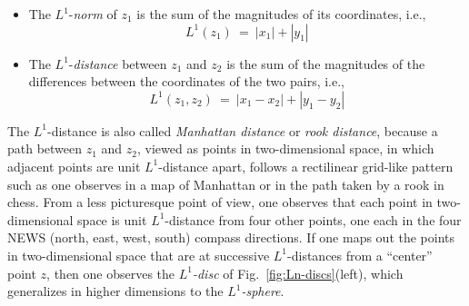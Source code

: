 \begin{itemize}
\item
The $L^1$-{\it norm} of $z_1$ is the sum of the magnitudes of its coordinates, i.e.,
\[ L^1(z_1) \ = \ |x_1| + |y_1|  \]  

\medskip\item
The $L^1$-{\it distance} between $z_1$ and $z_2$ is the sum of the magnitudes of the differences between the coordinates of the two pairs, i.e.,
\[ L^1(z_1, z_2) \ = \ |x_1 - x_2| + |y_1 - y_2| \]
\end{itemize}
The $L^1$-distance is also called {\it Manhattan distance} or {\it rook distance}, because a path between $z_1$ and $z_2$, viewed as points in two-dimensional space, in which adjacent points are unit $L^1$-distance apart, follows a rectilinear grid-like pattern such as one observes in a map of Manhattan or in the path taken by a rook in chess.  From a less picturesque point of view, one observes that each point in two-dimensional space is unit $L^1$-distance from four other points, one each in the four NEWS (north, east, west, south) compass directions.  If one maps out the points in two-dimensional space that are at successive $L^1$-distances from a ``center'' point $z$, then one observes the {\it $L^1$-disc} of Fig.~\ref{fig:Ln-discs}(left), which generalizes in higher dimensions to the {\it $L^1$-sphere}.  
